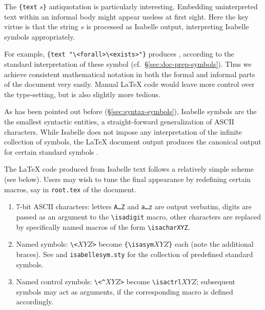 \begin{isabellebody}
\begin{isamarkuptext}
  \medskip The \texttt{\at}\verb,{text, $s$\verb,}, antiquotation is
  particularly interesting.  Embedding uninterpreted text within an
  informal body might appear useless at first sight.  Here the key
  virtue is that the string $s$ is processed as Isabelle output,
  interpreting Isabelle symbols appropriately.

  For example, \texttt{\at}\verb,{text "\<forall>\<exists>"}, produces \isa{{\isasymforall}{\isasymexists}}, according to the standard interpretation of these symbol
  (cf.\ \S\ref{sec:doc-prep-symbols}).  Thus we achieve consistent
  mathematical notation in both the formal and informal parts of the
  document very easily.  Manual {\LaTeX} code would leave more control
  over the type-setting, but is also slightly more tedious.%
\end{isamarkuptext}%
\isamarkuptrue%
%
\isamarkuptrue%
%
\begin{isamarkuptext}%
As has been pointed out before (\S\ref{sec:syntax-symbols}),
  Isabelle symbols are the the smallest syntactic entities, a
  straight-forward generalization of ASCII characters.  While Isabelle
  does not impose any interpretation of the infinite collection of
  symbols, the {\LaTeX} document output produces the canonical output
  for certain standard symbols \cite[appendix~A]{isabelle-sys}.

  The {\LaTeX} code produced from Isabelle text follows a relatively
  simple scheme (see below).  Users may wish to tune the final
  appearance by redefining certain macros, say in \texttt{root.tex} of
  the document.

  \begin{enumerate} \item 7-bit ASCII characters: letters
  \texttt{A\dots Z} and \texttt{a\dots z} are output verbatim, digits
  are passed as an argument to the \verb,\isadigit, macro, other
  characters are replaced by specifically named macros of the form
  \verb,\isacharXYZ,.

  \item Named symbols: \verb,\,\verb,<,$XYZ$\verb,>, become
  \verb,{\isasym,$XYZ$\verb,}, each (note the additional braces).  See
  \cite[appendix~A]{isabelle-sys} and \texttt{isabellesym.sty} for the
  collection of predefined standard symbols.

  \item Named control symbols: \verb,\,\verb,<^,$XYZ$\verb,>, become
  \verb,\isactrl,$XYZ$; subsequent symbols may act as arguments, if
  the corresponding macro is defined accordingly.
  \end{enumerate}


\end{isamarkuptext}
\end{isabellebody}
